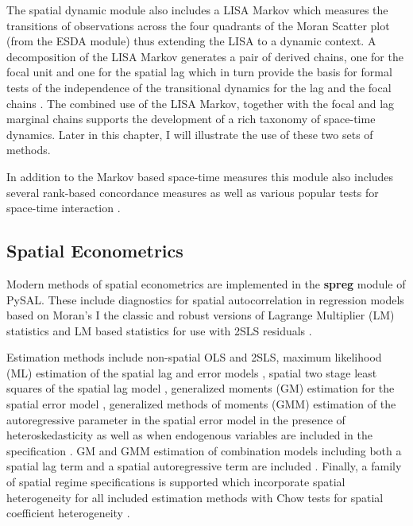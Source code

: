 \documentclass[11pt, titlepage]{amsart}
\begin{document}
The spatial dynamic module also includes a LISA Markov
\citep{Rey:2006uh}  which measures the transitions of observations
across the four quadrants of the Moran Scatter plot (from the ESDA
module) thus extending the LISA to a dynamic context. A decomposition of
the LISA Markov generates a pair of derived chains, one for the focal
unit and one for the spatial lag which in turn provide the basis for
formal tests of the independence of the transitional dynamics for the
lag and the focal chains \citep{Rey:2011gc}. The combined use of the LISA
Markov, together with the focal and lag marginal chains supports the
development of a rich taxonomy of space-time dynamics. Later in this
chapter, I will illustrate the use of these two sets of methods.

In addition to the Markov based space-time measures this module also
includes several rank-based concordance measures \citep{Rey:2013kq} as
well as various popular tests for space-time interaction \citep{Knox:1964vo,
Jacquez:1996hh}.

\subsection{Spatial Econometrics}

Modern methods of spatial econometrics are implemented in the
\textbf{spreg} module of PySAL. These include diagnostics for spatial
autocorrelation in regression models based on Moran's I
\citep{Cliff:1981dt} the classic and robust versions of Lagrange
Multiplier (LM) statistics \citep{Anselin:1991fk,Anselin:1996ge}  and
LM based statistics for use with 2SLS residuals \citep{Anselin:1997lr}.

Estimation methods include non-spatial OLS and 2SLS, maximum likelihood
(ML) estimation of the spatial lag and error models \citep{Ord:1975fk,
Anselin:1980ft, Anselin:1988wi, Smirnov:2001fk}, spatial two stage least
squares of the spatial lag model \citep{Anselin:1980ft, Anselin:1988wi},
generalized moments (GM) estimation for the spatial error model
\cite{Kelejian:1998dn}, generalized methods of moments (GMM) estimation
of the autoregressive parameter in the spatial error model in the
presence of heteroskedasticity  as well as when endogenous variables are
included in the specification \citep{Kelejian:2010fp}. GM and GMM
estimation of combination models including both a spatial lag term and a
spatial autoregressive term are included \citep{Kelejian:1998ec,
Arraiz:2010dq, Drukker:2013mi}. Finally, a family of spatial regime
specifications is supported which incorporate spatial heterogeneity for
all included estimation methods with Chow tests for spatial coefficient
heterogeneity \citep{Anselin:1990ye}.
\end{document}
